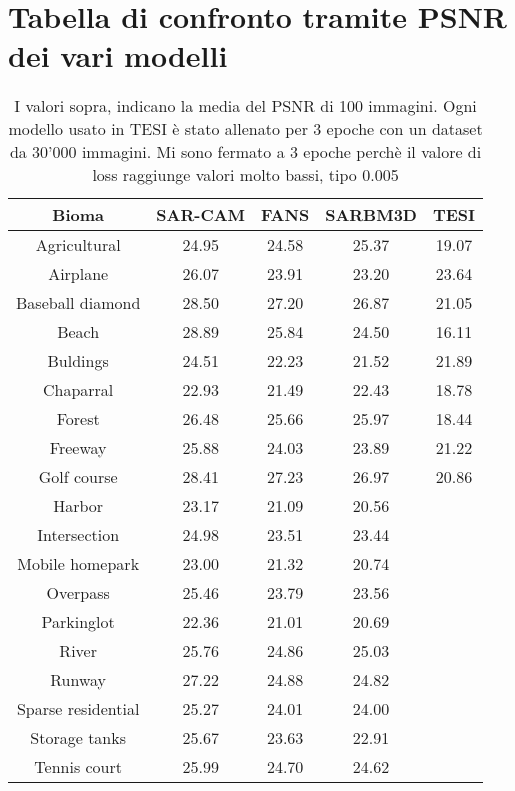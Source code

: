 
\chapter{Tabella di confronto tramite PSNR dei vari modelli  }


\begin{table}[h] %
    \centering
    \begin{tabular}{|c|c|c|c|c|}
    \hline
    Bioma & SAR-CAM & FANS & SARBM3D & TESI \\ \hline
    Agricultural &  24.95  & 24.58  & 25.37 & 19.07  \\ \hline
    Airplane & 26.07 & 23.91 & 23.20 & 23.64 \\ \hline
    Baseball diamond & 28.50 & 27.20 & 26.87 &  21.05\\ \hline
    Beach & 28.89 & 25.84 & 24.50 & 16.11 \\ \hline
    Buldings & 24.51 & 22.23 & 21.52 & 21.89 \\ \hline
    Chaparral & 22.93 & 21.49 & 22.43 & 18.78 \\ \hline
    Forest & 26.48 & 25.66 & 25.97 & 18.44 \\ \hline
    Freeway & 25.88 & 24.03 &  23.89 & 21.22 \\ \hline
    Golf course& 28.41 & 27.23 & 26.97 & 20.86 \\ \hline
    Harbor & 23.17 & 21.09 & 20.56 & \\ \hline
    Intersection & 24.98 & 23.51 & 23.44 & \\ \hline
    Mobile homepark& 23.00 & 21.32 & 20.74 & \\ \hline
    Overpass & 25.46 & 23.79 & 23.56 & \\ \hline
    Parkinglot & 22.36 & 21.01 & 20.69 & \\ \hline
    River & 25.76 & 24.86 & 25.03 & \\ \hline
    Runway & 27.22 & 24.88 & 24.82 & \\ \hline
    Sparse residential & 25.27 & 24.01 & 24.00 & \\ \hline
    Storage tanks & 25.67 & 23.63 & 22.91 & \\ \hline
    Tennis court & 25.99 & 24.70 & 24.62 & \\ \hline
    \end{tabular}
    \caption{I valori sopra, indicano la media del PSNR di 100 immagini.
    Ogni modello usato in TESI è stato allenato per 3 epoche con un dataset da 30'000 immagini.
    Mi sono fermato a 3 epoche perchè il valore di loss raggiunge valori molto bassi, tipo 0.005}
    \label{tab:esempio}
    \end{table}
    